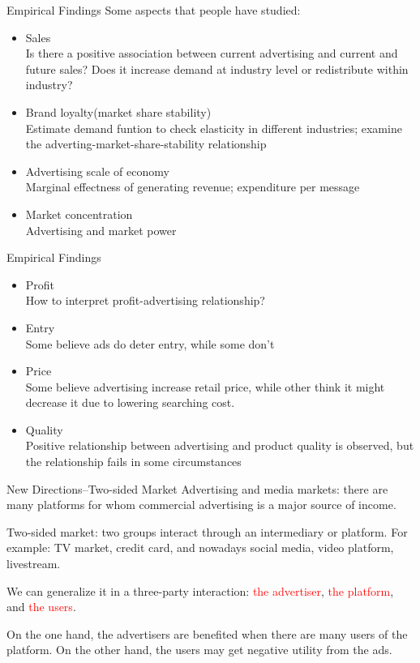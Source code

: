 \documentclass[10pt]{beamer}
\begin{document}
\begin{frame}{Empirical Findings}
Some aspects that people have studied:
\begin{itemize}
    \item Sales \\
    Is there a positive association between current advertising and current and future sales? Does it increase demand at industry level or redistribute within industry?
    \item Brand loyalty(market share stability)\\
    Estimate demand funtion to check elasticity in different industries; examine the adverting-market-share-stability relationship
    
    \item Advertising scale of economy\\
    Marginal effectness of generating revenue; expenditure per message
    \item Market concentration\\
    Advertising and market power

\end{itemize}
\end{frame}

\begin{frame}{Empirical Findings}
    \begin{itemize}
        \item Profit\\
        How to interpret profit-advertising relationship?
        \item Entry\\
        Some believe ads do deter entry, while some don't
        \item Price\\
        Some believe advertising increase retail price, while other think it might decrease it due to lowering searching cost.
        \item Quality \\
        Positive relationship between advertising and product quality is observed, but the relationship fails in some circumstances
    \end{itemize}
\end{frame}

\begin{frame}{New Directions--Two-sided Market}
Advertising and media markets: there are many platforms for whom commercial advertising is a major source of income. 

Two-sided market: two groups interact through an intermediary or platform. For example: TV market, credit card, and nowadays social media, video platform, livestream. 

We can generalize it in a three-party interaction: \textcolor{red}{the advertiser}, \textcolor{red}{the platform}, and \textcolor{red}{the users}.

On the one hand, the advertisers are benefited when there are many users of the platform. On the other hand, the users may get negative utility from the ads.
\end{frame}
\end{document}
